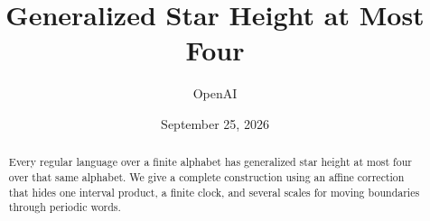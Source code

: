 \documentclass[11pt]{article}
\title{Generalized Star Height at Most Four}
\author{OpenAI}
\date{September 25, 2026}
\begin{document}
\maketitle
\begin{abstract}
Every regular language over a finite alphabet has generalized star height
at most four over that same alphabet. We give a complete construction using
an affine correction that hides one interval product, a finite clock, and
several scales for moving boundaries through periodic words.
\end{abstract}









\end{document}
